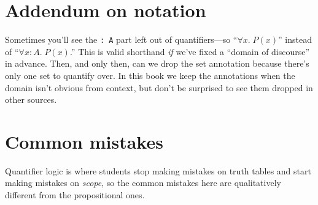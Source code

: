 \documentclass[11pt]{article}
\begin{document}
\section{Addendum on notation}
Sometimes you'll see the \texttt{:\,A} part left out of quantifiers---so ``$\forall x.\; P(x)$'' instead of ``$\forall x : A.\; P(x)$.'' This is valid shorthand \emph{if} we've fixed a ``domain of discourse'' in advance. Then, and only then, can we drop the set annotation because there's only one set to quantify over. In this book we keep the annotations when the domain isn't obvious from context, but don't be surprised to see them dropped in other sources.

\section{Common mistakes}

Quantifier logic is where students stop making mistakes on truth tables and start making mistakes on \emph{scope}, so the common mistakes here are qualitatively different from the propositional ones.
\end{document}

